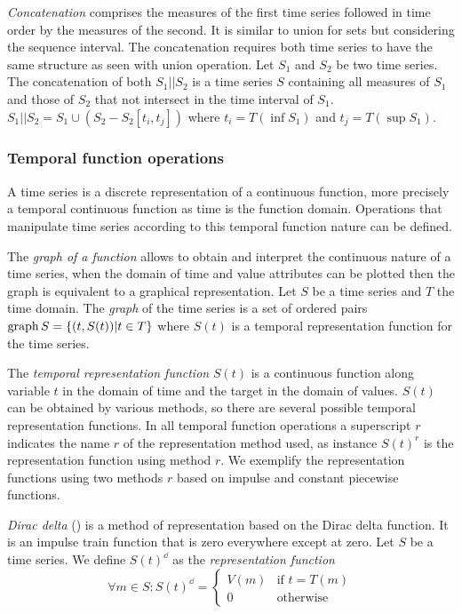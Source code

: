 \emph{Concatenation} comprises the measures of the first time series
followed in time order by the measures of the second. It is similar to
union for sets but considering the sequence interval. The
concatenation requires both time series to have the same structure as
seen with union operation.  Let $S_1$ and $S_2$ be two time series.
 The concatenation of both $S_1 || S_2$ is a time series $S$ containing
all measures of $S_1$ and those of $S_2$ that not intersect in the
time interval of $S_1$.  $S_1 || S_2 = S_1 \cup ( S_2 - S_2[t_i,t_j]
)$ where $t_i=T(\inf S_1)$ and $t_j=T(\sup S_1)$.



\subsubsection{Temporal function operations}
\label{sec:model:tfunc}

A time series is a discrete representation of a continuous function,
more precisely a temporal continuous function as time is the function
domain. Operations that manipulate time series according to this
temporal function nature can be defined.

The \emph{graph of a function} allows to obtain and interpret the
continuous nature of a time series, when the domain of time and value
attributes can be plotted then the graph is equivalent to a graphical
representation.  Let $S$ be a time series and $T$ the time domain. The
\emph{graph} of the time series is a set of ordered pairs $\operatorname*{graph} S =
\{ (t,S(t)) | t\in T \}$ where $S(t)$ is a temporal representation
function for the time series.

The \emph{temporal representation function} $S(t)$ is a continuous
function along variable $t$ in the domain of time and the target in
the domain of values. $S(t)$ can be obtained by various methods, so
there are several possible temporal representation functions. In all
temporal function operations a superscript $r$ indicates the name $r$
of the representation method used, as instance $S(t)^r$ is the
representation function using method $r$. We exemplify the
representation functions using two methods $r$ based on impulse and
constant piecewise functions.


\begin{definition}
  \emph{Dirac delta} (\dd) is a method of representation based on the
  Dirac delta function. It is an impulse train function that is zero
  everywhere except at zero.  Let $S$ be a time series. We define
  $S(t)^\dd$ as the \emph{\dd{} representation function}
\[
    \forall m \in S: S(t)^\dd
    =  \begin{cases}
      V(m) & \text{if }  t=T(m) \\
      0 & \text{otherwise}
    \end{cases}
\]
\end{definition}

